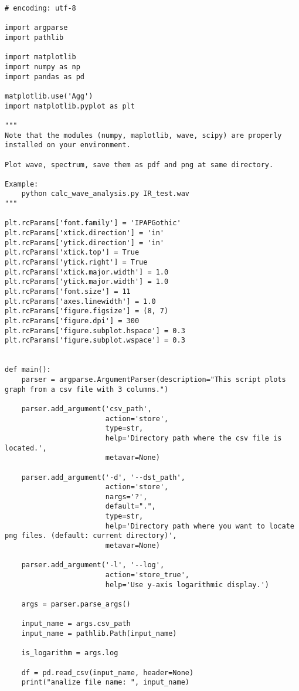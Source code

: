 \begin{lstlisting}[caption=plot\_from\_csv.py,label=plot_from_csv.py]
# encoding: utf-8

import argparse
import pathlib

import matplotlib
import numpy as np
import pandas as pd

matplotlib.use('Agg')
import matplotlib.pyplot as plt

"""
Note that the modules (numpy, maplotlib, wave, scipy) are properly installed on your environment.

Plot wave, spectrum, save them as pdf and png at same directory.

Example:
    python calc_wave_analysis.py IR_test.wav
"""

plt.rcParams['font.family'] = 'IPAPGothic'
plt.rcParams['xtick.direction'] = 'in'
plt.rcParams['ytick.direction'] = 'in'
plt.rcParams['xtick.top'] = True
plt.rcParams['ytick.right'] = True
plt.rcParams['xtick.major.width'] = 1.0
plt.rcParams['ytick.major.width'] = 1.0
plt.rcParams['font.size'] = 11
plt.rcParams['axes.linewidth'] = 1.0
plt.rcParams['figure.figsize'] = (8, 7)
plt.rcParams['figure.dpi'] = 300
plt.rcParams['figure.subplot.hspace'] = 0.3
plt.rcParams['figure.subplot.wspace'] = 0.3


def main():
    parser = argparse.ArgumentParser(description="This script plots graph from a csv file with 3 columns.")

    parser.add_argument('csv_path',
                        action='store',
                        type=str,
                        help='Directory path where the csv file is located.',
                        metavar=None)

    parser.add_argument('-d', '--dst_path',
                        action='store',
                        nargs='?',
                        default=".",
                        type=str,
                        help='Directory path where you want to locate png files. (default: current directory)',
                        metavar=None)

    parser.add_argument('-l', '--log',
                        action='store_true',
                        help='Use y-axis logarithmic display.')

    args = parser.parse_args()

    input_name = args.csv_path
    input_name = pathlib.Path(input_name)

    is_logarithm = args.log

    df = pd.read_csv(input_name, header=None)
    print("analize file name: ", input_name)


\end{lstlisting}
